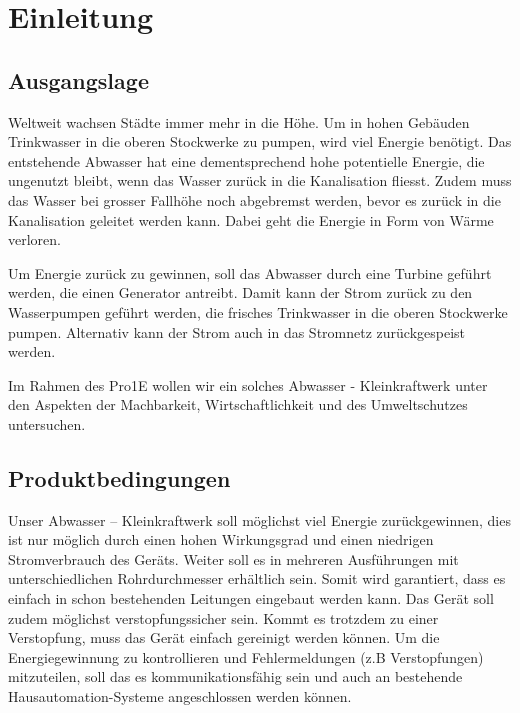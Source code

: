 \section{Einleitung}


\subsection{Ausgangslage}

Weltweit wachsen Städte immer mehr in die Höhe. Um in hohen Gebäuden Trinkwasser in die oberen Stockwerke zu pumpen, wird viel Energie benötigt. Das entstehende Abwasser hat eine dementsprechend hohe potentielle Energie, die ungenutzt bleibt, wenn das Wasser zurück in die Kanalisation fliesst. Zudem muss das Wasser bei grosser Fallhöhe noch abgebremst werden, bevor es zurück in die Kanalisation geleitet werden kann. Dabei geht die Energie in Form von Wärme verloren. 

Um Energie zurück zu gewinnen, soll das Abwasser durch eine Turbine geführt werden, die einen Generator antreibt. Damit kann der Strom zurück zu den Wasserpumpen geführt werden, die frisches Trinkwasser in die oberen Stockwerke pumpen. Alternativ kann der Strom auch in das Stromnetz zurückgespeist werden. 

Im Rahmen des Pro1E wollen wir ein solches Abwasser - Kleinkraftwerk unter den Aspekten der Machbarkeit, Wirtschaftlichkeit und des Umweltschutzes untersuchen.  


\subsection{Produktbedingungen}

Unser Abwasser – Kleinkraftwerk soll möglichst viel Energie zurückgewinnen, dies ist nur möglich durch einen hohen Wirkungsgrad und einen niedrigen Stromverbrauch des Geräts. Weiter soll es in mehreren Ausführungen mit unterschiedlichen Rohrdurchmesser erhältlich sein. Somit wird garantiert, dass es einfach in schon bestehenden Leitungen eingebaut werden kann. Das Gerät soll zudem möglichst verstopfungssicher sein. Kommt es trotzdem zu einer Verstopfung, muss das Gerät einfach gereinigt werden können. Um die Energiegewinnung zu kontrollieren und Fehlermeldungen (z.B Verstopfungen) mitzuteilen, soll das es kommunikationsfähig sein und auch an bestehende Hausautomation-Systeme angeschlossen werden können.



